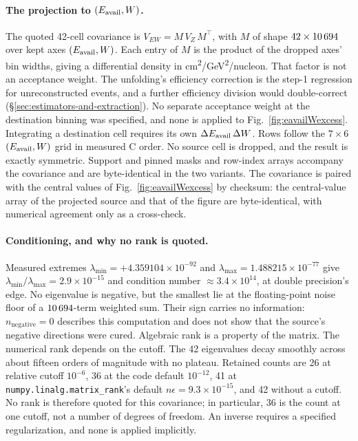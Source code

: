 \paragraph{The projection to $(E_{\mathrm{avail}},W)$.} The quoted 42-cell covariance is $V_{EW}=M\,V_Z\,M^{\top}$, with $M$ of shape $42\times10\,694$ over kept axes $(E_{\mathrm{avail}},W)$. Each entry of $M$ is the product of the dropped axes' bin widths, giving a differential density in \si{cm^2/GeV^2/nucleon}. That factor is not an acceptance weight. The unfolding's efficiency correction is the step-1 regression for unreconstructed events, and a further efficiency division would double-correct (\S\ref{sec:estimators-and-extraction}). No separate acceptance weight at the destination binning was specified, and none is applied to Fig.~\ref{fig:eavailWexcess}. Integrating a destination cell requires its own $\Delta E_{\mathrm{avail}}\,\Delta W$. Rows follow the $7\times6$ $(E_{\mathrm{avail}},W)$ grid in measured C order. No source cell is dropped, and the result is exactly symmetric. Support and pinned masks and row-index arrays accompany the covariance and are byte-identical in the two variants. The covariance is paired with the central values of Fig.~\ref{fig:eavailWexcess} by checksum: the central-value array of the projected source and that of the figure are byte-identical, with numerical agreement only as a cross-check.

\paragraph{Conditioning, and why no rank is quoted.} Measured extremes $\lambda_{\min}=+4.359104\times10^{-92}$ and $\lambda_{\max}=1.488215\times10^{-77}$ give $\lambda_{\min}/\lambda_{\max}=2.9\times10^{-15}$ and condition number $\approx3.4\times10^{14}$, at double precision's edge. No eigenvalue is negative, but the smallest lie at the floating-point noise floor of a $10\,694$-term weighted sum. Their sign carries no information: $n_{\mathrm{negative}}=0$ describes this computation and does not show that the source's negative directions were cured. Algebraic rank is a property of the matrix. The numerical rank depends on the cutoff. The 42 eigenvalues decay smoothly across about fifteen orders of magnitude with no plateau. Retained counts are 26 at relative cutoff $10^{-6}$, 36 at the code default $10^{-12}$, 41 at \texttt{numpy.linalg.matrix\_rank}'s default $n\epsilon=9.3\times10^{-15}$, and 42 without a cutoff. No rank is therefore quoted for this covariance; in particular, 36 is the count at one cutoff, not a number of degrees of freedom. An inverse requires a specified regularization, and none is applied implicitly.

